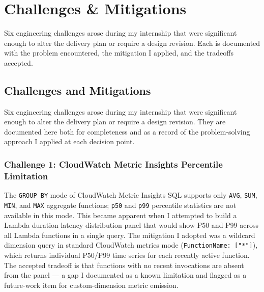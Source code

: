 
\chapter{Challenges \& Mitigations}
\label{chap:challenges}

Six engineering challenges arose during my internship that were significant
enough to alter the delivery plan or require a design revision. Each is
documented with the problem encountered, the mitigation I applied, and the
tradeoffs accepted.

\section{Challenges and Mitigations}
\label{sec:challenges}

Six engineering challenges arose during my internship that were significant
enough to alter the delivery plan or require a design revision. They are
documented here both for completeness and as a record of the problem-solving
approach I applied at each decision point.

\subsection{Challenge 1: CloudWatch Metric Insights Percentile Limitation}

The \texttt{GROUP BY} mode of CloudWatch Metric Insights SQL supports only
\texttt{AVG}, \texttt{SUM}, \texttt{MIN}, and \texttt{MAX} aggregate functions;
\texttt{p50} and \texttt{p99} percentile statistics are not available in this
mode. This became apparent when I attempted to build a Lambda duration latency
distribution panel that would show P50 and P99 across all Lambda functions in a
single query. The mitigation I adopted was a wildcard dimension query in standard
CloudWatch metrics mode (\texttt{FunctionName: ["*"]}), which returns individual
P50/P99 time series for each recently active function. The accepted tradeoff is
that functions with no recent invocations are absent from the panel --- a gap
I documented as a known limitation and flagged as a future-work item for
custom-dimension metric emission.

